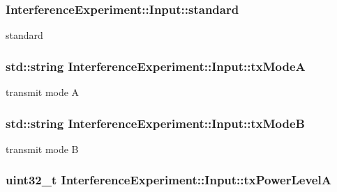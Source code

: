 \subsubsection[{\texorpdfstring{standard}{standard}}]{ Interference\+Experiment\+::\+Input\+::standard}\hypertarget{structInterferenceExperiment_1_1Input_a5c307c4b93ca1d8b5f06a0a143638e1b}{}\label{structInterferenceExperiment_1_1Input_a5c307c4b93ca1d8b5f06a0a143638e1b}


standard 

\subsubsection[{\texorpdfstring{tx\+ModeA}{txModeA}}]{\setlength{\rightskip}{0pt plus 5cm}std\+::string Interference\+Experiment\+::\+Input\+::tx\+ModeA}\hypertarget{structInterferenceExperiment_1_1Input_a45a8de8e6656eb04108d500707f2827d}{}\label{structInterferenceExperiment_1_1Input_a45a8de8e6656eb04108d500707f2827d}


transmit mode A 

\subsubsection[{\texorpdfstring{tx\+ModeB}{txModeB}}]{\setlength{\rightskip}{0pt plus 5cm}std\+::string Interference\+Experiment\+::\+Input\+::tx\+ModeB}\hypertarget{structInterferenceExperiment_1_1Input_a79f27f84600607d35444fb9840b5b3ef}{}\label{structInterferenceExperiment_1_1Input_a79f27f84600607d35444fb9840b5b3ef}


transmit mode B 

\subsubsection[{\texorpdfstring{tx\+Power\+LevelA}{txPowerLevelA}}]{\setlength{\rightskip}{0pt plus 5cm}uint32\+\_\+t Interference\+Experiment\+::\+Input\+::tx\+Power\+LevelA}\hypertarget{structInterferenceExperiment_1_1Input_a51a113cf642b065436543568a64d1c25}{}\label{structInterferenceExperiment_1_1Input_a51a113cf642b065436543568a64d1c25}


